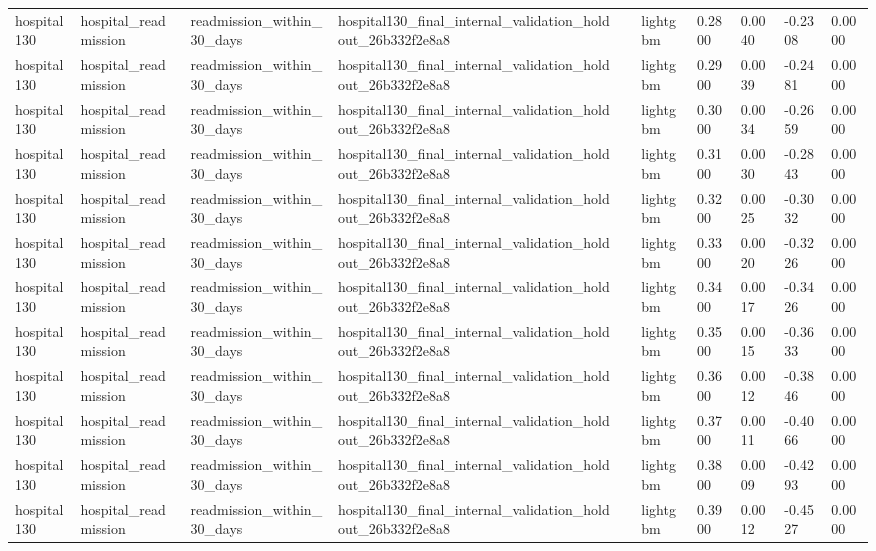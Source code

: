 \begin{tabular}{llllllllll}
hospital130 & hospital\_readmission & readmission\_within\_30\_days & hospital130\_final\_internal\_validation\_holdout\_26b332f2e8a8 &  & lightgbm & 0.2800 & 0.0040 & -0.2308 & 0.0000 \\
hospital130 & hospital\_readmission & readmission\_within\_30\_days & hospital130\_final\_internal\_validation\_holdout\_26b332f2e8a8 &  & lightgbm & 0.2900 & 0.0039 & -0.2481 & 0.0000 \\
hospital130 & hospital\_readmission & readmission\_within\_30\_days & hospital130\_final\_internal\_validation\_holdout\_26b332f2e8a8 &  & lightgbm & 0.3000 & 0.0034 & -0.2659 & 0.0000 \\
hospital130 & hospital\_readmission & readmission\_within\_30\_days & hospital130\_final\_internal\_validation\_holdout\_26b332f2e8a8 &  & lightgbm & 0.3100 & 0.0030 & -0.2843 & 0.0000 \\
hospital130 & hospital\_readmission & readmission\_within\_30\_days & hospital130\_final\_internal\_validation\_holdout\_26b332f2e8a8 &  & lightgbm & 0.3200 & 0.0025 & -0.3032 & 0.0000 \\
hospital130 & hospital\_readmission & readmission\_within\_30\_days & hospital130\_final\_internal\_validation\_holdout\_26b332f2e8a8 &  & lightgbm & 0.3300 & 0.0020 & -0.3226 & 0.0000 \\
hospital130 & hospital\_readmission & readmission\_within\_30\_days & hospital130\_final\_internal\_validation\_holdout\_26b332f2e8a8 &  & lightgbm & 0.3400 & 0.0017 & -0.3426 & 0.0000 \\
hospital130 & hospital\_readmission & readmission\_within\_30\_days & hospital130\_final\_internal\_validation\_holdout\_26b332f2e8a8 &  & lightgbm & 0.3500 & 0.0015 & -0.3633 & 0.0000 \\
hospital130 & hospital\_readmission & readmission\_within\_30\_days & hospital130\_final\_internal\_validation\_holdout\_26b332f2e8a8 &  & lightgbm & 0.3600 & 0.0012 & -0.3846 & 0.0000 \\
hospital130 & hospital\_readmission & readmission\_within\_30\_days & hospital130\_final\_internal\_validation\_holdout\_26b332f2e8a8 &  & lightgbm & 0.3700 & 0.0011 & -0.4066 & 0.0000 \\
hospital130 & hospital\_readmission & readmission\_within\_30\_days & hospital130\_final\_internal\_validation\_holdout\_26b332f2e8a8 &  & lightgbm & 0.3800 & 0.0009 & -0.4293 & 0.0000 \\
hospital130 & hospital\_readmission & readmission\_within\_30\_days & hospital130\_final\_internal\_validation\_holdout\_26b332f2e8a8 &  & lightgbm & 0.3900 & 0.0012 & -0.4527 & 0.0000 \\

\end{tabular}
